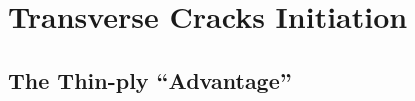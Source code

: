 \documentclass[first,firstsupp,lastsupp,last,hyperref,table]{ETHclass}
\begin{document}


\section{Transverse Cracks Initiation}

\subsection{The Thin-ply ``Advantage''}
\end{document}

